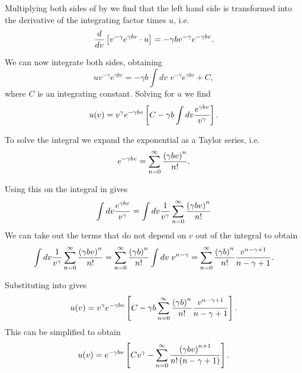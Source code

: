 Multiplying both sides of \eref[eq_dudv] by  we find
that the left hand side is transformed into the derivative of the integrating
factor times $u$, i.e.
\begin{equation}
  {d \over dv}\left[ v^{-\gamma} e^{\gamma b v} \cdot u \right] =
  -\gamma b v^{-\gamma} e^{-\gamma b v}.
\end{equation}

We can now integrate both sides, obtaining
\begin{equation}
u v^{-\gamma} e^{\gamma b v} =
-\gamma b \int dv \; v^{-\gamma} e^{\gamma b v} + C,
\end{equation}
where $C$ is an integrating constant. Solving for $u$ we find
\begin{equation}
  u(v) = v^{\gamma} e^{-\gamma b v} \left[ C -
  \gamma b \int dv {e^{\gamma b v} \over v^{\gamma}} \right].
  \label{eq_implicit_sol_u}
\end{equation}

To solve the integral we expand the exponential as a Taylor series, i.e.
\begin{equation}
  e^{-\gamma b v} = \sum_{n=0}^{\infty} {\left( \gamma b v \right)^n \over n!}.
\end{equation}

Using this on the integral in  gives
\begin{equation}
  \int dv {e^{\gamma b v} \over v^{\gamma}} =
  \int dv {1 \over v^{\gamma}}
  \sum_{n=0}^{\infty} {\left( \gamma b v \right)^n \over n!}
\end{equation}
We can take out the terms that do not depend on $v$ out of the integral to
obtain
\begin{equation}
\int dv {1 \over v^{\gamma}}
  \sum_{n=0}^{\infty} {\left( \gamma b v \right)^n \over n!} =
  \sum_{n=0}^{\infty} {\left( \gamma b \right)^n \over n!}
  \int dv \; v^{n - \gamma} =
  \sum_{n=0}^{\infty} {\left( \gamma b \right)^n \over n!}
  {v^{n - \gamma + 1} \over n - \gamma + 1}.
  \label{eq_integral_implicit_sol_u}
\end{equation}

Substituting  into 
gives
\begin{equation}
  u(v) = v^\gamma e^{-\gamma b v}
  \left[ C - \gamma b \sum_{n=0}^\infty {\left( \gamma b \right)^n \over n!}
  {v^{n - \gamma + 1} \over n - \gamma + 1} \right].
\end{equation}
This can be simplified to obtain
\begin{equation}
  u(v) = e^{-\gamma b v} \left[ C v^{\gamma}
  - \sum_{n=0}^\infty {\left( \gamma b v \right)^{n+1} \over
  n! \left( n - \gamma + 1 \right)} \right].
\end{equation}

